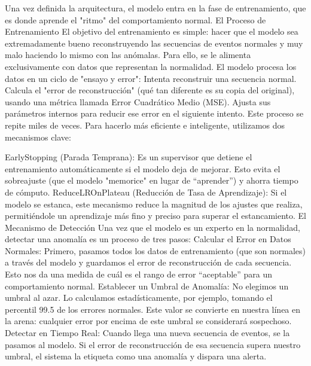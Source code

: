 \begin{enumerate}
\begin{enumerate}
                        Una vez definida la arquitectura, el modelo entra en la fase de entrenamiento, que es donde aprende el "ritmo" del comportamiento normal.
                        El Proceso de Entrenamiento
                        El objetivo del entrenamiento es simple: hacer que el modelo sea extremadamente bueno reconstruyendo las secuencias de eventos normales y muy malo haciendo lo mismo con las anómalas. Para ello, se le alimenta exclusivamente con datos que representan la normalidad.
                        El modelo procesa los datos en un ciclo de "ensayo y error":
                        Intenta reconstruir una secuencia normal.
                        Calcula el "error de reconstrucción" (qué tan diferente es su copia del original), usando una métrica llamada Error Cuadrático Medio (MSE).
                        Ajusta sus parámetros internos para reducir ese error en el siguiente intento.
                        Este proceso se repite miles de veces. Para hacerlo más eficiente e inteligente, utilizamos dos mecanismos clave:

                        EarlyStopping (Parada Temprana): Es un supervisor que detiene el entrenamiento automáticamente si el modelo deja de mejorar. Esto evita el sobreajuste (que el modelo "memorice" en lugar de ``aprender'') y ahorra tiempo de cómputo.
                        ReduceLROnPlateau (Reducción de Tasa de Aprendizaje): Si el modelo se estanca, este mecanismo reduce la magnitud de los ajustes que realiza, permitiéndole un aprendizaje más fino y preciso para superar el estancamiento.
                        El Mecanismo de Detección
                        Una vez que el modelo es un experto en la normalidad, detectar una anomalía es un proceso de tres pasos:
                        Calcular el Error en Datos Normales: Primero, pasamos todos los datos de entrenamiento (que son normales) a través del modelo y guardamos el error de reconstrucción de cada secuencia. Esto nos da una medida de cuál es el rango de error ``aceptable'' para un comportamiento normal.
                        Establecer un Umbral de Anomalía: No elegimos un umbral al azar. Lo calculamos estadísticamente, por ejemplo, tomando el percentil 99.5 de los errores normales. Este valor se convierte en nuestra línea en la arena: cualquier error por encima de este umbral se considerará sospechoso.
                        Detectar en Tiempo Real: Cuando llega una nueva secuencia de eventos, se la pasamos al modelo. Si el error de reconstrucción de esa secuencia supera nuestro umbral, el sistema la etiqueta como una anomalía y dispara una alerta.
            \end{enumerate}
\end{enumerate}

